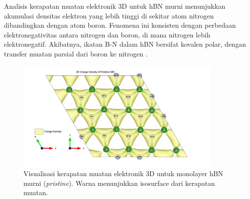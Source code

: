 Analisis kerapatan muatan elektronik 3D untuk hBN murni menunjukkan akumulasi densitas elektron yang lebih tinggi di sekitar atom nitrogen dibandingkan dengan atom boron. Fenomena ini konsisten dengan perbedaan elektronegativitas antara nitrogen dan boron, di mana nitrogen lebih elektronegatif. Akibatnya, ikatan B-N dalam hBN bersifat kovalen polar, dengan transfer muatan parsial dari boron ke nitrogen . 
\begin{figure}[h!]
    \centering
    \includegraphics[width=0.9\textwidth]{gambar_hasil/hBN_rho_3d_pristine.png}
    \caption{Visualisasi kerapatan muatan elektronik 3D untuk monolayer hBN murni (\textit{pristine}). Warna menunjukkan isosurface dari kerapatan muatan.}
    \label{fig:hbn_pristine_chargedensity}
\end{figure}

